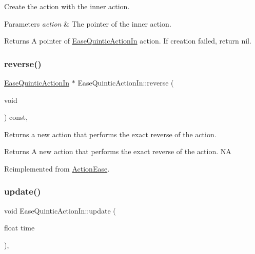 Create the action with the inner action. 


\begin{DoxyParams}{Parameters}
{\em action} & The pointer of the inner action. \\
\hline
\end{DoxyParams}
\begin{DoxyReturn}{Returns}
A pointer of \hyperlink{classEaseQuinticActionIn}{Ease\+Quintic\+Action\+In} action. If creation failed, return nil. 
\end{DoxyReturn}
\mbox{\label{classEaseQuinticActionIn_a7f99df08baa80e8f09e0fbde4d143696}} 
\subsubsection{\texorpdfstring{reverse()}{reverse()}}
{\footnotesize\ttfamily \hyperlink{classEaseQuinticActionIn}{Ease\+Quintic\+Action\+In} $\ast$ Ease\+Quintic\+Action\+In\+::reverse (\begin{DoxyParamCaption}\item[{void}]{ }\end{DoxyParamCaption}) const\hspace{0.3cm}{\ttfamily [override]}, {\ttfamily [virtual]}}

Returns a new action that performs the exact reverse of the action.

\begin{DoxyReturn}{Returns}
A new action that performs the exact reverse of the action.  NA 
\end{DoxyReturn}


Reimplemented from \hyperlink{classActionEase_ab99eb083fa033fae1d6c948fdc730782}{Action\+Ease}.

\mbox{\label{classEaseQuinticActionIn_a168f914597d873e6071d39118f2cf9f5}} 
\subsubsection{\texorpdfstring{update()}{update()}}
{\footnotesize\ttfamily void Ease\+Quintic\+Action\+In\+::update (\begin{DoxyParamCaption}\item[{float}]{time }\end{DoxyParamCaption})\hspace{0.3cm}{\ttfamily [override]}, {\ttfamily [virtual]}}

